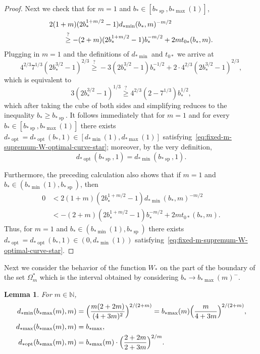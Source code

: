 \documentclass[a4paper]{amsart} %
\newtheorem{lemma}[theorem]{Lemma}
\theoremstyle{definition}
\theoremstyle{remark}
\numberwithin{equation}{section}
\newcommand*{\NNone}{\mathbb{N}}
\newcommand*{\bStar}{b_*}
\newcommand*{\tZeroStar}{t_{0*}}
\newcommand*{\specialbdStar}[1]{\Omega_{#1}^*}
\newcommand*{\XXXspecialbdStar}{W_*}
\newcommand*{\bMinStar}{b_{*\!\min}}
\newcommand*{\bMaxStar}{b_{*\!\max}}
\newcommand*{\dMinStar}{d_{*\!\min}}
\newcommand*{\dMaxStar}{d_{*\!\max}}
\newcommand*{\dOptStar}{d_{*\!\operatorname{opt}}}
\newcommand*{\bShStar}{b_{*\!\operatorname{sp}}}
\begin{document}
\begin{proof}
	Next we check that for $m=1$ and $\bStar\in [\bShStar, \bMaxStar(1)]$,
	\begin{align*}
	\MoveEqLeft[2]
	2(1+m)(2\bStar^{1+m/2} -1) \dMinStar(\bStar,m)^{-m/2} \\
	&\overset{?}{\geq}  -(2+m)(2\bStar^{1+m/2} - 1) \bStar^{-m/2}  
	+ 2m \tZeroStar(\bStar,m).
	\end{align*}
	Plugging in $m=1$ and the definitions of $\dMinStar$ and $\tZeroStar$ we arrive at
	\begin{equation*}
	4^{2/3} 7^{1/3} (2\bStar^{3/2} -1)^{2/3}  \overset{?}{\geq} 
	-3(2\bStar^{3/2} - 1) \bStar^{-1/2}
	+ 2 \cdot4^{2/3}(2\bStar^{3/2} -1)^{2/3},
	\end{equation*}
	which is equivalent to
	\begin{equation*}
	3(2\bStar^{3/2} - 1)^{1/3} 
	\overset{?}{\geq}  4^{2/3}(2 - 7^{1/3}) \bStar^{1/2},
	\end{equation*}
	which after taking the cube of both sides and simplifying reduces to the inequality $\bStar\geq\bShStar$.
	It follows immediately that for $m=1$ and  for every $\bStar\in [\bShStar, \bMaxStar(1)]$ 
	there exists $\dOptStar = \dOptStar(\bStar,1)\in [\dMinStar(1),\dMaxStar(1)]$ 
	satisfying~\eqref{eq:fixed-m-supremum-W-optimal-curve-star};
	moreover, by the very definition, 
	\[
	\dOptStar(\bShStar,1) = \dMinStar(\bShStar, 1).
	\]
	
	Furthermore, the preceding calculation also shows that
	if $m=1$ and $\bStar\in (\bMinStar(1),\bShStar)$, then
	\begin{align*}
	0 &< 2(1+m)(2\bStar^{1+m/2} -1) \dMinStar(\bStar,m)^{-m/2} \\
	& <  -(2+m)(2\bStar^{1+m/2} - 1) \bStar^{-m/2}  
	+ 2m \tZeroStar(\bStar,m).
	\end{align*}
	Thus, for $m=1$ and $\bStar\in (\bMinStar(1),\bShStar)$
	there exists $\dOptStar = \dOptStar(\bStar,1)\in (0,\dMinStar(1))$ satisfying~\eqref{eq:fixed-m-supremum-W-optimal-curve-star}.
\end{proof}


Next we consider the behavior of the function $\XXXspecialbdStar$
on the part of the boundary of the  set $\specialbdStar{m}$ 
which is the interval obtained by considering $\bStar \to \bMaxStar(m) ^-$.

\begin{lemma}
	\label{lem:lower-bound-fixed-m-special-b-c-d-boundary-bMin-star}
	For $m\in\NNone$,
	\begin{align}
	\nonumber
	\dMinStar(\bMaxStar(m), m) &=  \Bigl(\frac{m(2+2m)}{(4+3m)^2}\Bigr)^{2/(2+m)}
	= \bMaxStar(m) \Bigl(\frac{m}{4+3m}\Bigr)^{2/(2+m)}, \\
	\nonumber
	\dMaxStar(\bMaxStar(m),m) &= \bMaxStar,\\
	\label{eq:dOpt-for-bMin-star}
	\dOptStar(\bMaxStar(m),m) &= \bMaxStar(m) \cdot \Bigl( \frac{2+2m}{2+3m}\Bigr)^{2/m}.
	\end{align}
\end{lemma}
\end{document}
